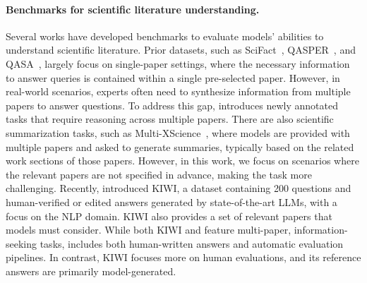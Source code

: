 \paragraph{Benchmarks for scientific literature understanding.}
Several works have developed benchmarks to evaluate models' abilities to understand scientific literature. Prior datasets, such as SciFact~\citep{wadden-etal-2020-fact}, QASPER~\citep{dasigi-etal-2021-dataset}, and QASA~\citep{lee2023qasa}, largely focus on single-paper settings, where the necessary information to answer queries is contained within a single pre-selected paper. However, in real-world scenarios, experts often need to synthesize information from multiple papers to answer questions. To address this gap, \data introduces newly annotated tasks that require reasoning across multiple papers.
There are also scientific summarization tasks, such as Multi-XScience~\citep{lu2020multi}, where models are provided with multiple papers and asked to generate summaries, typically based on the related work sections of those papers. However, in this work, we focus on scenarios where the relevant papers are not specified in advance, making the task more challenging. 
Recently, \citet{xu-etal-2024-kiwi} introduced KIWI, a dataset containing 200 questions and human-verified or edited answers generated by state-of-the-art LLMs, with a focus on the NLP domain. KIWI also provides a set of relevant papers that models must consider. While both KIWI and \data feature multi-paper, information-seeking tasks, \data includes both human-written answers and automatic evaluation pipelines. In contrast, KIWI focuses more on human evaluations, and its reference answers are primarily model-generated.





